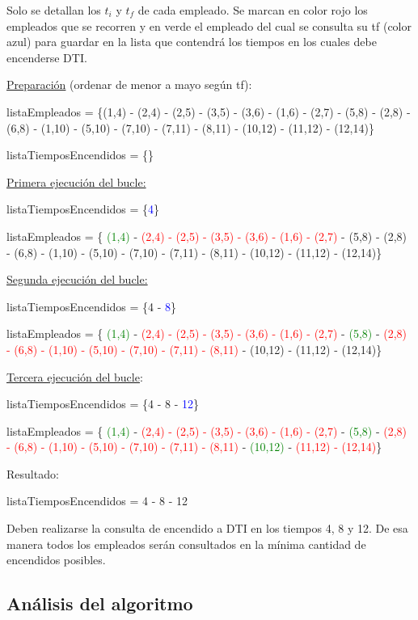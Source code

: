 \documentclass{article}
\begin{document}
Solo se detallan los \(t_i\) y \(t_f\) de cada empleado. 
Se marcan en color rojo los empleados que se recorren y en verde el empleado del cual 
se consulta su tf (color azul) para guardar en la lista que contendrá los tiempos en los 
cuales debe encenderse DTI.


\underline{Preparación} (ordenar de menor a mayo según tf):

listaEmpleados = \{(1,4) - (2,4) - (2,5) - (3,5) - (3,6) - (1,6) - (2,7) - (5,8) - (2,8) - (6,8) - (1,10) - (5,10) - (7,10) - (7,11) - (8,11) - (10,12) - (11,12) - (12,14)\}

listaTiemposEncendidos = \{\}


\underline{Primera ejecución del bucle:}

listaTiemposEncendidos = \{\textcolor{blue}{4}\}

listaEmpleados = \{ \textcolor{green}{(1,4)} - \textcolor{red}{(2,4) - (2,5) - (3,5) - (3,6) - (1,6) - (2,7)} - (5,8) - (2,8) - (6,8) - (1,10) - (5,10) - (7,10) - (7,11) - (8,11) - (10,12) - (11,12) - (12,14)\}

\underline{Segunda ejecución del bucle:}

listaTiemposEncendidos = \{4 - \textcolor{blue}{8}\}

listaEmpleados = \{ \textcolor{green}{(1,4)} - \textcolor{red}{(2,4) - (2,5) - (3,5) - (3,6) - (1,6) - (2,7)} - \textcolor{green}{(5,8)} - \textcolor{red}{(2,8) - (6,8) - (1,10) - (5,10) - (7,10) - (7,11) - (8,11)} - (10,12) - (11,12) - (12,14)\}

\underline{Tercera ejecución del bucle}:

listaTiemposEncendidos = \{4 - 8 - \textcolor{blue}{12}\}

listaEmpleados = \{ \textcolor{green}{(1,4)} - \textcolor{red}{(2,4) - (2,5) - (3,5) - (3,6) - (1,6) - (2,7)} - \textcolor{green}{(5,8)} - \textcolor{red}{(2,8) - (6,8) - (1,10) - (5,10) - (7,10) - (7,11) - (8,11)} - \textcolor{green}{(10,12)} - \textcolor{red}{(11,12) - (12,14)}\}


Resultado:

listaTiemposEncendidos = {4 - 8 - 12}


Deben realizarse la consulta de encendido a DTI en los tiempos 4, 8 y 12. De esa manera todos los empleados serán consultados en la mínima cantidad de encendidos posibles.


\subsection{Análisis del algoritmo}
\end{document}
